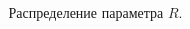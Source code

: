 \documentclass[pdf,hyperref={unicode}]{beamer}
\begin{document}
\begin{frame}
\begin{columns}
\begin{column}{0.47\linewidth}
\end{column}
\begin{column}{0.47\linewidth}
{
\begin{figure}[h]
\caption{ \tiny Распределение параметра $R$.}
\end{figure}
}
\end{column}
\end{columns}
\end{frame}
\end{document}
